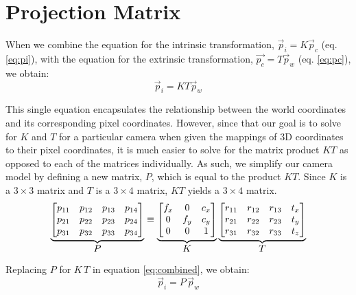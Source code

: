 \section{Projection Matrix} \label{sec:projection}

When we combine the equation for the intrinsic transformation, $\vec{p}_i = K\vec{p}_c$ (eq. \ref{eq:pi}), with the equation for the extrinsic transformation, $\vec{p_c} = T\vec{p}_w$ (eq. \ref{eq:pc}), we obtain:
\begin{equation} \label{eq:combined}
    \vec{p}_{i} = KT\vec{p}_{w}
\end{equation}

This single equation encapsulates the relationship between the world coordinates and its corresponding pixel coordinates. However, since that our goal is to solve for $K$ and $T$ for a particular camera when given the mappings of 3D coordinates to their pixel coordinates, it is much easier to solve for the matrix product $KT$ as opposed to each of the matrices individually. As such, we simplify our camera model by defining a new matrix, $P$, which is equal to the product $KT$. Since $K$ is a $3 \times 3$ matrix and $T$ is a $3 \times 4$ matrix, $KT$ yields a $3 \times 4$ matrix. 
\begin{equation}
    \underbrace{
        \begin{bmatrix}
        p_{11} & p_{12} & p_{13} & p_{14} \\
        p_{21} & p_{22} & p_{23} & p_{24} \\
        p_{31} & p_{32} & p_{33} & p_{34}
    \end{bmatrix}
    }_{\mathlarger{P}}
    \equiv
    \underbrace{
        \begin{bmatrix}
            f_x & 0   & c_x \\
            0   & f_y & c_y \\
            0   & 0   & 1
        \end{bmatrix}
    }_{\mathlarger{K}}
    \underbrace{
        \begin{bmatrix}
            r_{11} & r_{12} & r_{13} & t_x \\
            r_{21} & r_{22} & r_{23} & t_y \\
            r_{31} & r_{32} & r_{33} & t_z \\
        \end{bmatrix}
    }_{\mathlarger{T}}
\end{equation}

Replacing $P$ for $K\,T$ in equation \ref{eq:combined}, we obtain:
\begin{equation} \label{eq:project}
    \vec{p}_{i} = P\,\vec{p}_{w}
\end{equation}


